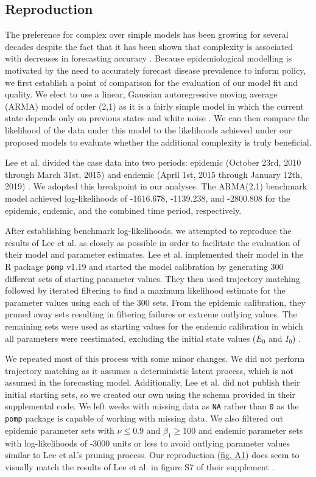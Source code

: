 \documentclass[12pt]{article}
\begin{document}
\subsection{Reproduction}

 The preference for complex over simple models has been growing for several decades despite the fact that it has been shown that complexity is associated with decreases in forecasting accuracy \cite{Green}. Because epidemiological modelling is motivated by the need to accurately forecast disease prevalence to inform policy, we first establish a point of comparison for the evaluation of our model fit and quality. We elect to use a linear, Gaussian autoregressive moving average (ARMA) model of order (2,1) as it is a fairly simple model in which the current state depends only on previous states and white noise \cite{Shumway_ch3}. We can then compare the likelihood of the data under this model to the likelihoods achieved under our proposed models to evaluate whether the additional complexity is truly beneficial.
  
  Lee et al. divided the case data into two periods: epidemic (October 23rd, 2010 through March 31st, 2015) and endemic (April 1st, 2015 through January 12th, 2019) \cite{Lee_supp}. We adopted this breakpoint in our analyses. The ARMA(2,1) benchmark model achieved log-likelihoods of -1616.678, -1139.238, and -2800.808 for the epidemic, endemic, and the combined time period, respectively.
  
 After establishing benchmark log-likelihoods, we attempted to reproduce the results of Lee et al. as closely as possible in order to facilitate the evaluation of their model and parameter estimates. Lee et al. implemented their model in the R package \texttt{pomp} v1.19 and started the model calibration by generating 300 different sets of starting parameter values. They then used trajectory matching followed by iterated filtering to find a maximum likelihood estimate for the parameter values using each of the 300 sets. From the epidemic calibration, they pruned away sets resulting in filtering failures or extreme outlying values. The remaining sets were used as starting values for the endemic calibration in which all parameters were reestimated, excluding the initial state values ($E_0$ and $I_0$) \cite{Lee_supp}.

  We repeated most of this process with some minor changes. We did not perform trajectory matching as it assumes a deterministic latent process, which is not assumed in the forecasting model. Additionally, Lee et al. did not publish their initial starting sets, so we created our own using the schema provided in their supplemental code. We left weeks with missing data as \texttt{NA} rather than \texttt{0} as the \texttt{pomp} package is capable of working with missing data. We also filtered out epidemic parameter sets with $\nu \leq 0.9$ and $\beta_1 \geq 100$ and endemic parameter sets with log-likelihoods of -3000 units or less to avoid outlying parameter values similar to Lee et al.'s pruning process. Our reproduction (\hyperref[fig:A1]{fig. A1}) does seem to visually match the results of Lee et al. in figure S7 of their supplement \cite{Lee_supp}. 
\end{document}
